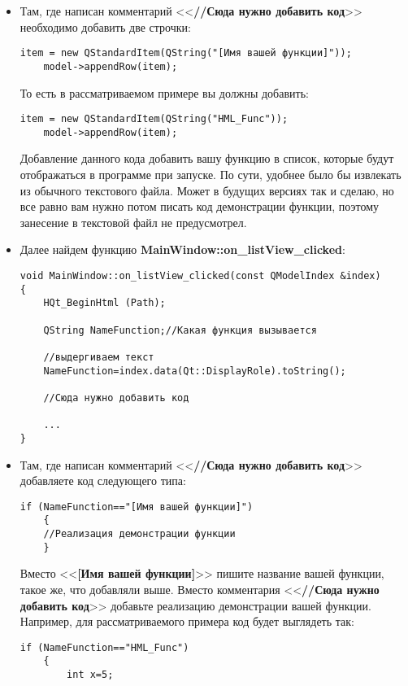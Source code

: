 \begin{itemize}
\item Там, где написан комментарий <<\textbf{//Сюда нужно добавить код}>> необходимо добавить две строчки:
\begin{lstlisting}[label=examplefunction04, caption=Что добавить в mainwindow.cpp]
    item = new QStandardItem(QString("[Имя вашей функции]"));
    model->appendRow(item);
\end{lstlisting}
То есть в рассматриваемом примере вы должны добавить:
\begin{lstlisting}[label=examplefunction05, caption=Что добавить в mainwindow.cpp в примере]
    item = new QStandardItem(QString("HML_Func"));
    model->appendRow(item);
\end{lstlisting}
Добавление данного кода добавить вашу функцию в список, которые будут отображаться в программе при запуске. По сути, удобнее было бы извлекать из обычного текстового файла. Может в будущих версиях так и сделаю, но все равно вам нужно потом писать код демонстрации функции, поэтому занесение в текстовой файл не предусмотрел.
\item Далее найдем функцию \textbf{MainWindow::on\_listView\_clicked}:
\begin{lstlisting}[label=examplefunction06, caption=MainWindow::on\_listView\_clicked]
void MainWindow::on_listView_clicked(const QModelIndex &index)
{
    HQt_BeginHtml (Path);

    QString NameFunction;//Какая функция вызывается

    //выдергиваем текст
    NameFunction=index.data(Qt::DisplayRole).toString();

    //Сюда нужно добавить код
	
	...
}
\end{lstlisting}
\item Там, где написан комментарий <<\textbf{//Сюда нужно добавить код}>> добавляете код следующего типа:
\begin{lstlisting}[label=examplefunction07, caption=Добавление демонстрации работы функции]
    if (NameFunction=="[Имя вашей функции]")
    {
	//Реализация демонстрации функции
    }
\end{lstlisting}
Вместо <<\textbf{[Имя вашей функции]}>> пишите название вашей функции, такое же, что добавляли выше. Вместо комментария <<\textbf{//Сюда нужно добавить код}>> добавьте реализацию демонстрации вашей функции. Например, для рассматриваемого примера код будет выглядеть так:
\begin{lstlisting}[label=examplefunction08, caption=Добавление демонстрации работы функции на примере]
    if (NameFunction=="HML_Func")
    {
        int x=5;


\end{lstlisting}
\end{itemize}
